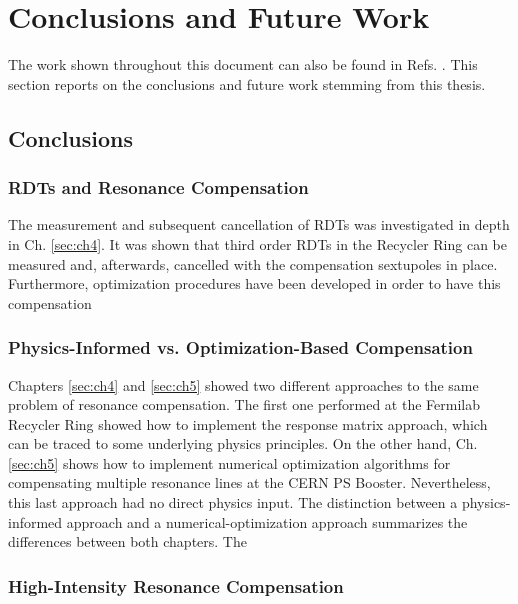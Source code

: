 \chapter{Conclusions and Future Work}
\label{sec:ch7}

The work shown throughout this document can also be found in Refs. \cite{cris1,cris2, cris3}. This section reports on the conclusions and future work stemming from this thesis.

\section{Conclusions}

\subsection{RDTs and Resonance Compensation}

The measurement and subsequent cancellation of RDTs was investigated in depth in Ch. \ref{sec:ch4}. It was shown that third order RDTs in the Recycler Ring can be measured and, afterwards, cancelled with the compensation sextupoles in place. Furthermore, optimization procedures have been developed in order to have this compensation   

\subsection{Physics-Informed vs. Optimization-Based Compensation}

Chapters \ref{sec:ch4} and \ref{sec:ch5} showed two different approaches to the same problem of resonance compensation. The first one performed at the Fermilab Recycler Ring showed how to implement the response matrix approach, which can be traced to some underlying physics principles. On the other hand, Ch. \ref{sec:ch5} shows how to implement numerical optimization algorithms for compensating multiple resonance lines at the CERN PS Booster. Nevertheless, this last approach had no direct physics input. The distinction between a physics-informed approach and a numerical-optimization approach summarizes the differences between both chapters. The 

\subsection{High-Intensity Resonance Compensation}


